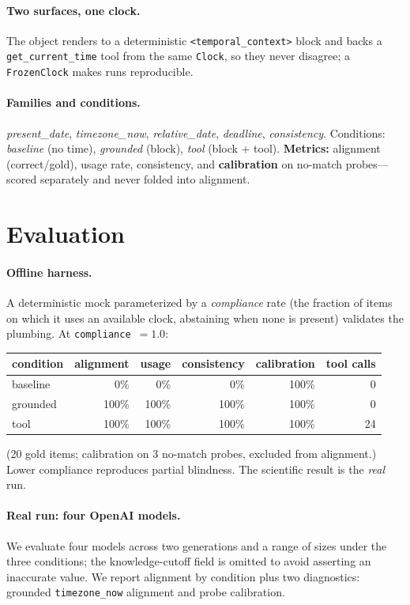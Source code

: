 \documentclass[11pt]{article}
\begin{document}
\paragraph{Two surfaces, one clock.} The object renders to a deterministic
\texttt{<temporal\_context>} block and backs a \texttt{get\_current\_time} tool from the same
\texttt{Clock}, so they never disagree; a \texttt{FrozenClock} makes runs reproducible.

\paragraph{Families and conditions.} \emph{present\_date}, \emph{timezone\_now}, \emph{relative\_date},
\emph{deadline}, \emph{consistency}. Conditions: \emph{baseline} (no time), \emph{grounded} (block),
\emph{tool} (block + tool). \textbf{Metrics:} alignment (correct/gold), usage rate, consistency, and
\textbf{calibration} on no-match probes---scored separately and never folded into alignment.

\section{Evaluation}
\paragraph{Offline harness.} A deterministic mock parameterized by a \emph{compliance} rate (the
fraction of items on which it uses an available clock, abstaining when none is present) validates
the plumbing. At \texttt{compliance}~$=1.0$:

\begin{center}
\begin{tabular}{lrrrrr}
\toprule
condition & alignment & usage & consistency & calibration & tool calls \\
\midrule
baseline & 0\% & 0\% & 0\% & 100\% & 0 \\
grounded & 100\% & 100\% & 100\% & 100\% & 0 \\
tool & 100\% & 100\% & 100\% & 100\% & 24 \\
\bottomrule
\end{tabular}
\end{center}

\noindent (20 gold items; calibration on 3 no-match probes, excluded from alignment.) Lower
compliance reproduces partial blindness. The scientific result is the \emph{real} run.

\paragraph{Real run: four OpenAI models.} We evaluate four models across two generations and a
range of sizes under the three conditions; the knowledge-cutoff field is omitted to avoid asserting
an inaccurate value. We report alignment by condition plus two diagnostics: grounded
\texttt{timezone\_now} alignment and probe calibration.
\end{document}
